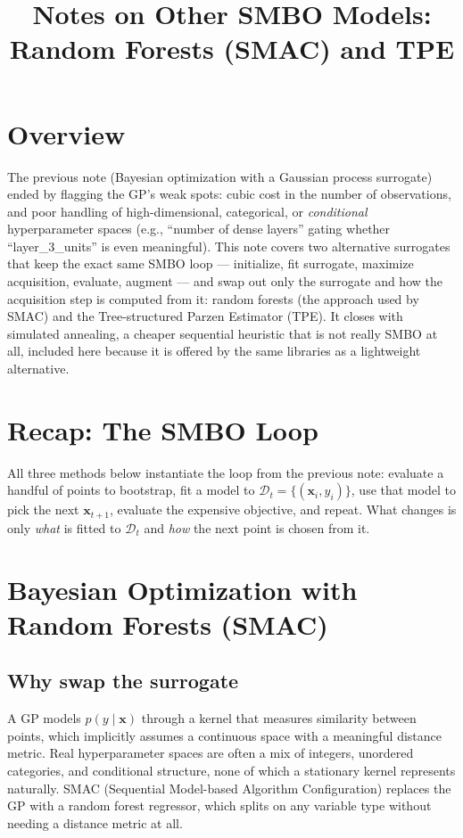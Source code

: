 \documentclass[conference]{IEEEtran}
\title{Notes on Other SMBO Models: Random Forests (SMAC) and TPE}
\author{
\IEEEauthorblockN{Luis Mendez}
}
\begin{document}
\maketitle

\section*{Overview}
The previous note (Bayesian optimization with a Gaussian process surrogate) ended by flagging the GP's weak spots: cubic cost in the number of observations, and poor handling of high-dimensional, categorical, or \textit{conditional} hyperparameter spaces (e.g., ``number of dense layers'' gating whether ``layer\_3\_units'' is even meaningful). This note covers two alternative surrogates that keep the exact same SMBO loop --- initialize, fit surrogate, maximize acquisition, evaluate, augment --- and swap out only the surrogate and how the acquisition step is computed from it: random forests (the approach used by SMAC) and the Tree-structured Parzen Estimator (TPE). It closes with simulated annealing, a cheaper sequential heuristic that is not really SMBO at all, included here because it is offered by the same libraries as a lightweight alternative.

\section*{Recap: The SMBO Loop}
All three methods below instantiate the loop from the previous note: evaluate a handful of points to bootstrap, fit a model to $\mathcal{D}_t = \{(\mathbf{x}_i, y_i)\}$, use that model to pick the next $\mathbf{x}_{t+1}$, evaluate the expensive objective, and repeat. What changes is only \textit{what} is fitted to $\mathcal{D}_t$ and \textit{how} the next point is chosen from it.

\section*{Bayesian Optimization with Random Forests (SMAC)}
\subsection*{Why swap the surrogate}
A GP models $p(y \mid \mathbf{x})$ through a kernel that measures similarity between points, which implicitly assumes a continuous space with a meaningful distance metric. Real hyperparameter spaces are often a mix of integers, unordered categories, and conditional structure, none of which a stationary kernel represents naturally. SMAC (Sequential Model-based Algorithm Configuration) replaces the GP with a random forest regressor, which splits on any variable type without needing a distance metric at all.
\end{document}
